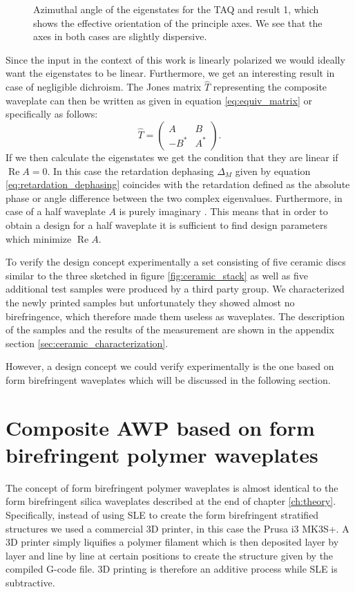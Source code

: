 \begin{figure}[H]
    \centering
    
    \caption{Azimuthal angle of the eigenstates for the TAQ and result 1, which shows the effective orientation of the principle axes. We see that the axes in both cases are slightly dispersive.}
    \label{fig:cl4_eigenstate_azimuths}
\end{figure}

Since the input in the context of this work is linearly polarized we would ideally want the eigenstates to be linear. Furthermore, we get an interesting result in case of negligible dichroism. The Jones matrix $\hat{T}$ representing the composite waveplate can then be written as given in equation \ref{eq:equiv_matrix} or specifically as follows:
\begin{equation}
    \hat{T} = 
    \begin{pmatrix} 
    A & B \\
    -B^* & A^*
    \end{pmatrix}.
\end{equation}
If we then calculate the eigenstates we get the condition that they are linear if $\operatorname{Re}A=0$. In this case the retardation dephasing $\Delta_M$ given by equation \ref{eq:retardation_dephasing} coincides with the retardation defined as the absolute phase or angle difference between the two complex eigenvalues. Furthermore, in case of a half waveplate $A$ is purely imaginary \cite{McIntyre1968}. This means that in order to obtain a design for a half waveplate it is sufficient to find design parameters which minimize $\operatorname{Re}A$.

To verify the design concept experimentally a set consisting of five ceramic discs similar to the three sketched in figure \ref{fig:ceramic_stack} as well as five additional test samples were produced by a third party group. We characterized the newly printed samples but unfortunately they showed almost no birefringence, which therefore made them useless as waveplates. The description of the samples and the results of the measurement are shown in the appendix section \ref{sec:ceramic_characterization}. 

However, a design concept we could verify experimentally is the one based on form birefringent waveplates which will be discussed in the following section.

\section{Composite AWP based on form birefringent polymer waveplates}
The concept of form birefringent polymer waveplates is almost identical to the form birefringent silica waveplates described at the end of chapter \ref{ch:theory}. Specifically, instead of using SLE to create the form birefringent stratified structures we used a commercial 3D printer, in this case the Prusa i3 MK3S+. A 3D printer simply liquifies a polymer filament which is then deposited layer by layer and line by line at certain positions to create the structure given by the compiled G-code file. 3D printing is therefore an additive process while SLE is subtractive.

